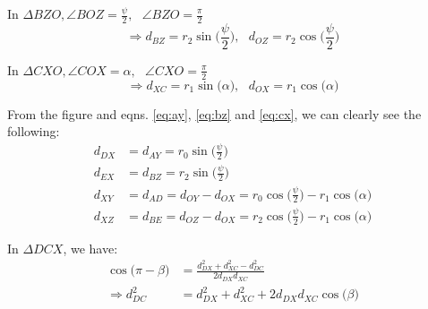     In $\Delta BZO ,\angle BOZ = \displaystyle\frac{\psi}{2}, \: \: \: \angle BZO = \frac{\pi}{2}$
    \begin{equation}
    \label{eq:bz}
        \Rightarrow d_{BZ} = r_2  \sin \Big(\displaystyle\frac{\psi}{2}\Big), \: \: \: d_{OZ} = r_2  \cos \Big(\displaystyle\frac{\psi}{2}\Big)
    \end{equation}

    In $\Delta CXO ,\angle COX = \alpha, \: \: \: \angle CXO = \frac{\pi}{2}$
    \begin{equation}
    \label{eq:cx}
        \Rightarrow d_{XC} = r_1  \sin \big(\alpha\big), \: \: \: d_{OX} = r_1  \cos \big(\alpha\big)
    \end{equation}

    From the figure and eqns. \eqref{eq:ay}, \eqref{eq:bz} and \eqref{eq:cx}, we can clearly see the following:
    \begin{equation}
    \label{eq:adbe}
        \begin{aligned}
            d_{DX} &= d_{AY} = r_0  \sin \Big(\displaystyle\frac{\psi}{2}\Big)\\
            d_{EX} &= d_{BZ} = r_2  \sin \Big(\displaystyle\frac{\psi}{2}\Big)\\
            d_{XY} &= d_{AD} = d_{OY} - d_{OX} = r_0  \cos \Big(\displaystyle\frac{\psi}{2}\Big) - r_1  \cos \big(\alpha\big)\\
            d_{XZ} &= d_{BE} = d_{OZ} - d_{OX} = r_2  \cos \Big(\displaystyle\frac{\psi}{2}\Big) - r_1  \cos \big(\alpha\big)
        \end{aligned}
    \end{equation}

    In $\Delta DCX$, we have:
    \begin{equation}
    \label{eq:dc}
        \begin{aligned}
            \cos \big( \pi - \beta \big) &= \frac{d_{DX}^2 + d_{XC}^2 - d_{DC}^2}{2  d_{DX}  d_{XC}}\\
            \Rightarrow d_{DC}^2 &= d_{DX}^2 + d_{XC}^2 + 2  d_{DX}  d_{XC}  \cos \big( \beta \big)
        \end{aligned}
    \end{equation}

